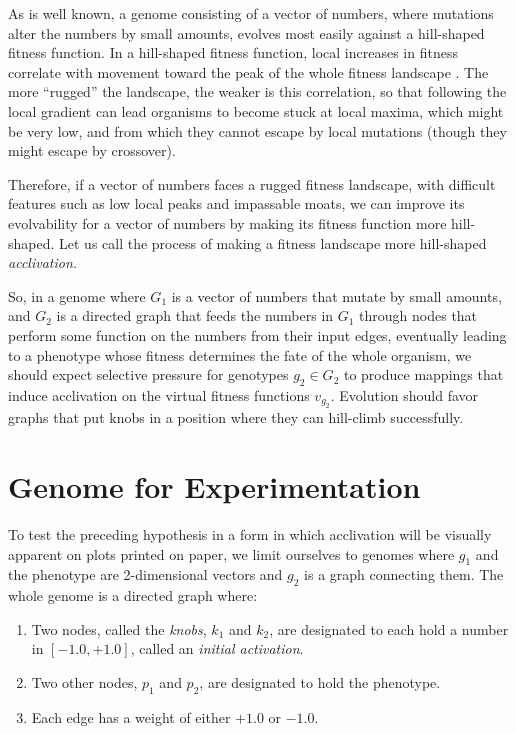 \documentclass[letterpaper]{article}
\begin{document}
As is well known, a genome consisting of a vector of numbers, where mutations
alter the numbers by small amounts, evolves most easily against a hill-shaped
fitness function. In a hill-shaped fitness function, local increases in
fitness correlate with movement toward the peak of the whole fitness
landscape \citep{kauffman1987towards}. The more ``rugged'' the landscape, the
weaker is this correlation, so that following the local gradient can lead
organisms to become stuck at local maxima, which might be very low, and from
which they cannot escape by local mutations (though they might escape by
crossover).

Therefore, if a vector of numbers faces a rugged fitness landscape, with
difficult features such as low local peaks and impassable moats, we can
improve its evolvability for a vector of numbers by making its fitness
function more hill-shaped. Let us call the process of making a fitness
landscape more hill-shaped \textit{acclivation.}

So, in a genome where $G_1$ is a vector of numbers that mutate by small
amounts, and $G_2$ is a directed graph that feeds the numbers in $G_1$ through
nodes that perform some function on the numbers from their input edges,
eventually leading to a phenotype whose fitness determines the fate of the
whole organism, we should expect selective pressure for genotypes $g_2 \in
G_2$ to produce mappings that induce acclivation on the virtual fitness
functions $v_{g_2}$. Evolution should favor graphs that put knobs in a
position where they can hill-climb successfully.

\section{Genome for Experimentation}

To test the preceding hypothesis in a form in which acclivation will be
visually apparent on plots printed on paper, we limit ourselves to genomes
where $g_1$ and the phenotype are 2-dimensional vectors and $g_2$ is a graph
connecting them.  The whole genome is a directed graph where:
\begin{enumerate}
   \item Two nodes, called the \textit{knobs}, $k_1$ and $k_2$, are designated
      to each hold a number in $[-1.0, +1.0]$, called an \textit{initial
      activation}.
   \item Two other nodes, $p_1$ and $p_2$, are designated to hold the
      phenotype.
   \item Each edge has a weight of either $+1.0$ or $-1.0$.
\end{enumerate}
\end{document}
